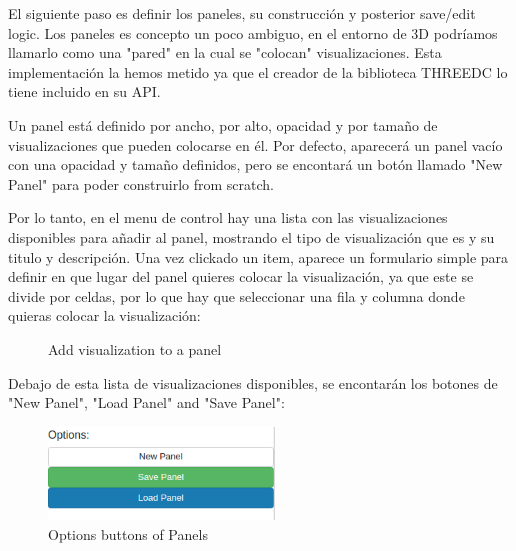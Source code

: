 \documentclass[a4paper, 12pt]{book}
\begin{document}
El siguiente paso es definir los paneles, su construcción y posterior save/edit logic. Los paneles es concepto un poco ambiguo, en el entorno de 3D podríamos llamarlo como una "pared" en la cual se "colocan" visualizaciones. Esta implementación la hemos metido ya que el creador de la biblioteca THREEDC lo tiene incluido en su API.

Un panel está definido por ancho, por alto, opacidad y por tamaño de visualizaciones que pueden colocarse en él. Por defecto, aparecerá un panel vacío con una opacidad y tamaño definidos, pero se encontará un botón llamado "New Panel" para poder construirlo from scratch.

Por lo tanto, en el menu de control hay una lista con las visualizaciones disponibles para añadir al panel, mostrando el tipo de visualización que es y su titulo y descripción. Una vez clickado un item, aparece un formulario simple para definir en que lugar del panel quieres colocar la visualización, ya que este se divide por celdas, por lo que hay que seleccionar una fila y columna donde quieras colocar la visualización:

\begin{figure}[H]
 \centering
 \caption{Add visualization to a panel}
 \label{f:threedcexamples}
\end{figure}

Debajo de esta lista de visualizaciones disponibles, se encontarán los botones de "New Panel", "Load Panel" and "Save Panel":

\begin{figure}[H]
  \centering
  \includegraphics[width=6cm, keepaspectratio]{img/development/panelsbuttons}
  \caption{Options buttons of Panels}
  \label{fig:panelsbuttons}
\end{figure}
\end{document}
